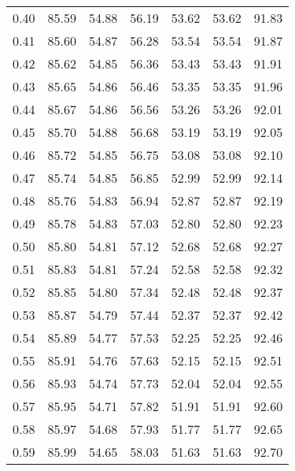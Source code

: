 \begin{tabular}{|c|c|c|c|c|c|c|}
      0.40 &     85.59 &     54.88 &      56.19 &   53.62 &      53.62 &         91.83 \\
      0.41 &     85.60 &     54.87 &      56.28 &   53.54 &      53.54 &         91.87 \\
      0.42 &     85.62 &     54.85 &      56.36 &   53.43 &      53.43 &         91.91 \\
      0.43 &     85.65 &     54.86 &      56.46 &   53.35 &      53.35 &         91.96 \\
      0.44 &     85.67 &     54.86 &      56.56 &   53.26 &      53.26 &         92.01 \\
      0.45 &     85.70 &     54.88 &      56.68 &   53.19 &      53.19 &         92.05 \\
      0.46 &     85.72 &     54.85 &      56.75 &   53.08 &      53.08 &         92.10 \\
      0.47 &     85.74 &     54.85 &      56.85 &   52.99 &      52.99 &         92.14 \\
      0.48 &     85.76 &     54.83 &      56.94 &   52.87 &      52.87 &         92.19 \\
      0.49 &     85.78 &     54.83 &      57.03 &   52.80 &      52.80 &         92.23 \\
      0.50 &     85.80 &     54.81 &      57.12 &   52.68 &      52.68 &         92.27 \\
      0.51 &     85.83 &     54.81 &      57.24 &   52.58 &      52.58 &         92.32 \\
      0.52 &     85.85 &     54.80 &      57.34 &   52.48 &      52.48 &         92.37 \\
      0.53 &     85.87 &     54.79 &      57.44 &   52.37 &      52.37 &         92.42 \\
      0.54 &     85.89 &     54.77 &      57.53 &   52.25 &      52.25 &         92.46 \\
      0.55 &     85.91 &     54.76 &      57.63 &   52.15 &      52.15 &         92.51 \\
      0.56 &     85.93 &     54.74 &      57.73 &   52.04 &      52.04 &         92.55 \\
      0.57 &     85.95 &     54.71 &      57.82 &   51.91 &      51.91 &         92.60 \\
      0.58 &     85.97 &     54.68 &      57.93 &   51.77 &      51.77 &         92.65 \\
      0.59 &     85.99 &     54.65 &      58.03 &   51.63 &      51.63 &         92.70 \\

\end{tabular}
